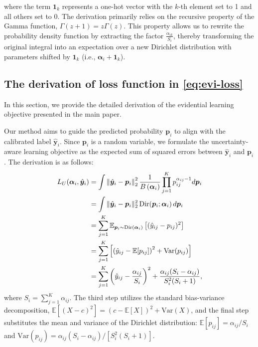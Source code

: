 where the term $\mathbf{1}_k$ represents a one-hot vector with the $k$-th element set to 1 and all others set to 0. The derivation primarily relies on the recursive property of the Gamma function, $\Gamma(z+1) = z\Gamma(z)$. This property allows us to rewrite the probability density function by extracting the factor $\displaystyle\frac{\alpha_{ik}}{S_i}$, thereby transforming the original integral into an expectation over a new Dirichlet distribution with parameters shifted by $\mathbf{1}_k$ (i.e., $\boldsymbol{\alpha}_i + \mathbf{1}_k$).
\subsection{The derivation of loss function in \cref{eq:evi-loss}}
\label{appendix:equation17}
In this section, we provide the detailed derivation of the evidential learning objective presented in the main paper. 

Our method aims to guide the predicted probability $\boldsymbol{p}_i$ to align with the calibrated label $\hat{\boldsymbol{y}}_i$. Since $\boldsymbol{p}_i$ is a random variable, we formulate the uncertainty-aware learning objective as the expected sum of squared errors between $\hat{\boldsymbol{y}}_i$ and $\boldsymbol{p}_i$. The derivation is as follows:
\begin{equation}
\setlength{\abovedisplayskip}{2pt}
\setlength{\belowdisplayskip}{2pt}
    \begin{split}
        {L}_U(\boldsymbol{\alpha}_i, \hat{\boldsymbol{y}}_i)
        &=\int\left\|\hat{\boldsymbol y}_i-\boldsymbol{p}_i\right\|_2^2 \frac{1}{B\left(\boldsymbol{\alpha}_i\right)} \prod_{j=1}^{K} p_{i j}^{\alpha_{i j}-1} d \boldsymbol{p}_i \\
        &= \int \|\hat{\boldsymbol{y}}_i - \boldsymbol{p}_i\|_2^2 \, \text{Dir}(\boldsymbol{p}_i; \boldsymbol{\alpha}_i) \, d\boldsymbol{p}_i \\
        &= \sum_{j=1}^K \mathbb{E}_{\boldsymbol{p}_i \sim \text{Dir}(\boldsymbol{\alpha}_i)} \left[ (\hat{y}_{ij} - p_{ij})^2 \right] \\
        &= \sum_{j=1}^K \left[ \left( \hat{y}_{ij} - \mathbb{E}[p_{ij}] \right)^2 + \text{Var}(p_{ij}) \right] \\
        &= \sum_{j=1}^K \left( \hat{y}_{ij} - \frac{\alpha_{ij}}{S_i} \right)^2 + \frac{\alpha_{ij} (S_i - \alpha_{ij})}{S_i^2 (S_i + 1)},
    \end{split}
\end{equation}
where $S_i = \sum_{j=1}^K \alpha_{ij}$. The third step utilizes the standard bias-variance decomposition, $\mathbb{E}[(X-c)^2] = (c-\mathbb{E}[X])^2 + \text{Var}(X)$, and the final step substitutes the mean and variance of the Dirichlet distribution: $\mathbb{E}[p_{ij}] = \alpha_{ij}/S_i$ and $\text{Var}(p_{ij}) = \alpha_{ij}(S_i-\alpha_{ij}) / [S_i^2(S_i+1)]$.
